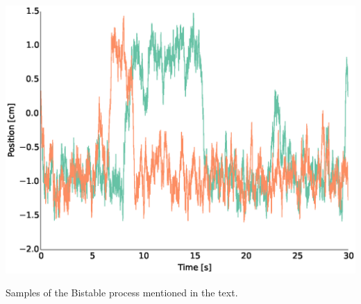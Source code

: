 \begin{marginfigure}
\includegraphics[width=\columnwidth]{figures/figure_5_10.eps}
\caption[Bistable Processes.]{Samples of the Bistable process mentioned in the text.}
\label{fig:bistable_samples}
\end{marginfigure}


